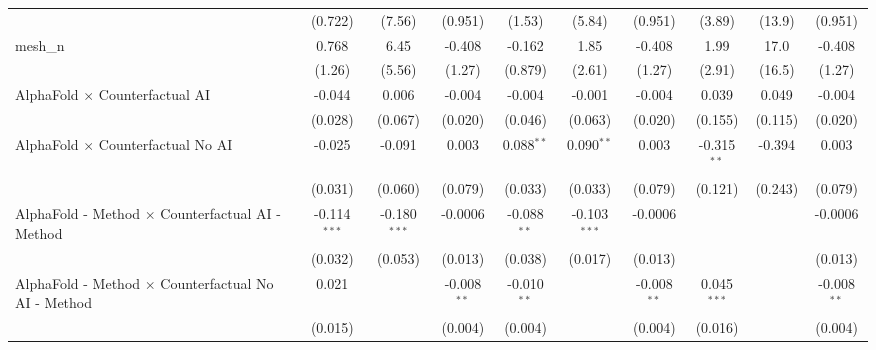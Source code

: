 \begin{tabular}{lccccccccc}
                                                               & (0.722)        & (7.56)         & (0.951)        & (1.53)        & (5.84)         & (0.951)        & (3.89)        & (13.9)       & (0.951)\\   
   mesh\_n                                                     & 0.768          & 6.45           & -0.408         & -0.162        & 1.85           & -0.408         & 1.99          & 17.0         & -0.408\\   
                                                               & (1.26)         & (5.56)         & (1.27)         & (0.879)       & (2.61)         & (1.27)         & (2.91)        & (16.5)       & (1.27)\\   
   AlphaFold $\times$ Counterfactual AI                        & -0.044         & 0.006          & -0.004         & -0.004        & -0.001         & -0.004         & 0.039         & 0.049        & -0.004\\   
                                                               & (0.028)        & (0.067)        & (0.020)        & (0.046)       & (0.063)        & (0.020)        & (0.155)       & (0.115)      & (0.020)\\   
   AlphaFold $\times$ Counterfactual No AI                     & -0.025         & -0.091         & 0.003          & 0.088$^{**}$  & 0.090$^{**}$   & 0.003          & -0.315$^{**}$ & -0.394       & 0.003\\   
                                                               & (0.031)        & (0.060)        & (0.079)        & (0.033)       & (0.033)        & (0.079)        & (0.121)       & (0.243)      & (0.079)\\   
   AlphaFold - Method $\times$ Counterfactual AI - Method      & -0.114$^{***}$ & -0.180$^{***}$ & -0.0006        & -0.088$^{**}$ & -0.103$^{***}$ & -0.0006        &               &              & -0.0006\\   
                                                               & (0.032)        & (0.053)        & (0.013)        & (0.038)       & (0.017)        & (0.013)        &               &              & (0.013)\\   
   AlphaFold - Method $\times$ Counterfactual No AI - Method   & 0.021          &                & -0.008$^{**}$  & -0.010$^{**}$ &                & -0.008$^{**}$  & 0.045$^{***}$ &              & -0.008$^{**}$\\   
                                                               & (0.015)        &                & (0.004)        & (0.004)       &                & (0.004)        & (0.016)       &              & (0.004)\\   

\end{tabular}

